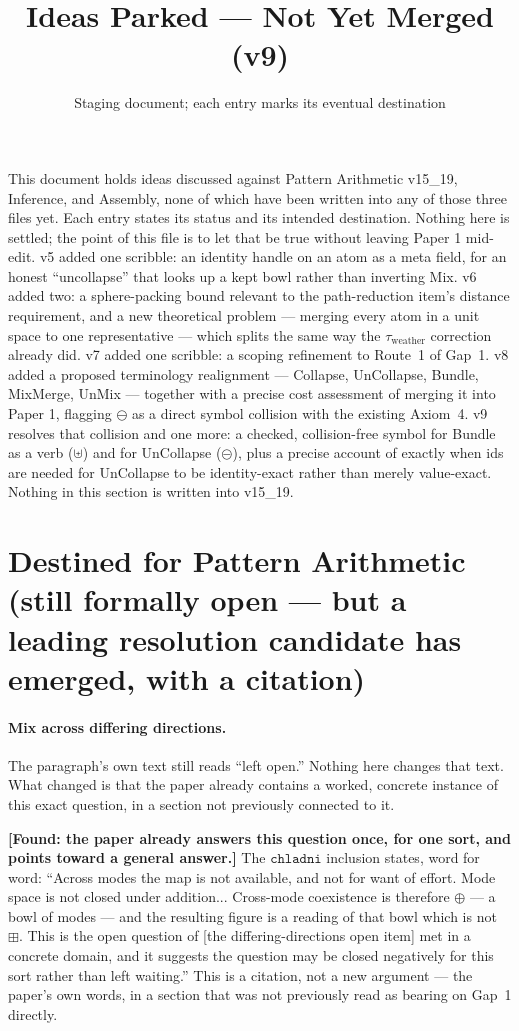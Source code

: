 \documentclass[11pt]{article}
\title{Ideas Parked --- Not Yet Merged (v9)}
\author{Staging document; each entry marks its eventual destination}
\date{}
\begin{document}
\maketitle

\noindent This document holds ideas discussed against Pattern Arithmetic
v15\_19, Inference, and Assembly, none of which have been written into
any of those three files yet. Each entry states its status and its
intended destination. Nothing here is settled; the point of this file
is to let that be true without leaving Paper 1 mid-edit.
v5 added one scribble: an identity handle on an atom as a meta field,
for an honest ``uncollapse'' that looks up a kept bowl rather than
inverting Mix. v6 added two: a sphere-packing bound relevant to the
path-reduction item's distance requirement, and a new theoretical
problem --- merging every atom in a unit space to one representative
--- which splits the same way the $\tau_{\text{weather}}$ correction
already did. v7 added one scribble: a scoping refinement to Route~1 of
Gap~1. v8 added a proposed terminology realignment --- Collapse,
UnCollapse, Bundle, MixMerge, UnMix --- together with a precise cost
assessment of merging it into Paper 1, flagging $\ominus$ as a direct
symbol collision with the existing Axiom~4. v9 resolves that
collision and one more: a checked, collision-free symbol for Bundle
as a verb ($\uplus$) and for UnCollapse ($\circleddash$), plus a
precise account of exactly when ids are needed for UnCollapse to be
identity-exact rather than merely value-exact. Nothing in this
section is written into v15\_19.

\section{Destined for Pattern Arithmetic (still formally open ---
but a leading resolution candidate has emerged, with a citation)}

\paragraph{Mix across differing directions.} The paragraph's own text
still reads ``left open.'' Nothing here changes that text. What
changed is that the paper already contains a worked, concrete instance
of this exact question, in a section not previously connected to it.

\textbf{[Found: the paper already answers this question once, for one
sort, and points toward a general answer.]} The $\mathtt{chladni}$
inclusion states, word for word: ``Across modes the map is not
available, and not for want of effort. Mode space is not closed under
addition... Cross-mode coexistence is therefore $\oplus$ --- a bowl of
modes --- and the resulting figure is a reading of that bowl which is
not $\boxplus$. This is the open question of
[the differing-directions open item] met in a concrete domain,
and it suggests the question may be closed negatively for this sort
rather than left waiting.'' This is a citation, not a new argument ---
the paper's own words, in a section that was not previously read as
bearing on Gap~1 directly.
\end{document}
